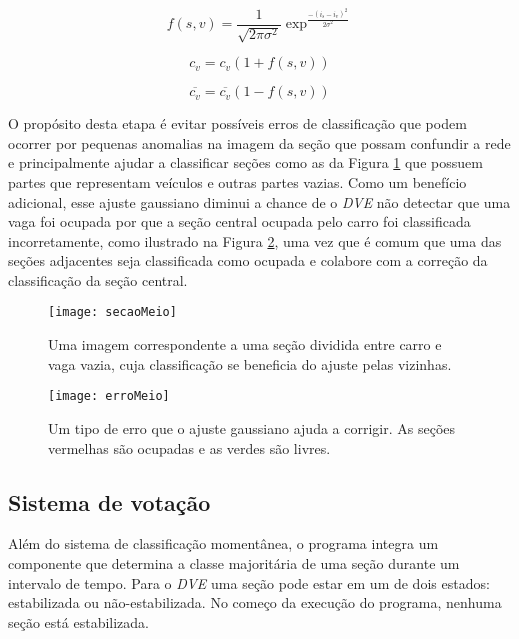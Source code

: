 \begin{equation}
	f(s,v) = \frac{1}{\sqrt{2\pi\sigma^2}} \exp^{\frac{-(i_s-i_v)^2}{2\sigma^2}} 
\label{eq:gaussiana}
\end{equation}

\begin{equation}
	c_v  = c_v(1+f(s,v))
\label{eq:novoCv}
\end{equation}

\begin{equation}
	\overline{c_v}  = \overline{c_v}(1-f(s,v))
\label{eq:novoRCv}
\end{equation}

O propósito desta etapa é evitar possíveis erros de classificação que podem ocorrer por pequenas anomalias na imagem da seção que possam confundir a rede e principalmente ajudar a classificar seções como as da Figura \ref{fig:secaoMeio} que possuem partes que representam veículos e outras partes vazias. Como um benefício adicional, esse ajuste gaussiano diminui a chance de o \textit{DVE} não detectar que uma vaga foi ocupada por que a seção central ocupada pelo carro foi classificada incorretamente, como ilustrado na Figura \ref{fig:erromeio}, uma vez que é comum que uma das seções adjacentes seja classificada como ocupada e colabore com a correção da classificação da seção central.


\begin{figure}
	\centering
	\texttt{[image: secaoMeio]}
	\caption{Uma imagem correspondente a uma seção dividida entre carro e vaga vazia, cuja classificação se beneficia do ajuste pelas vizinhas.}
	\label{fig:secaoMeio}
	\centering
\end{figure}

\begin{figure}
	\centering
	\texttt{[image: erroMeio]}
	\caption{Um tipo de erro que o ajuste gaussiano ajuda a corrigir. As seções vermelhas são ocupadas e as verdes são livres.}
	\label{fig:erromeio}
	\centering
\end{figure}

\subsection{Sistema de votação}\label{sec:votacao}

Além do sistema de classificação momentânea, o programa integra um componente que determina a classe majoritária de uma seção durante um intervalo de tempo. Para o \textit{DVE} uma seção pode estar em um de dois estados: estabilizada ou não-estabilizada. No começo da execução do programa, nenhuma seção está estabilizada. 

